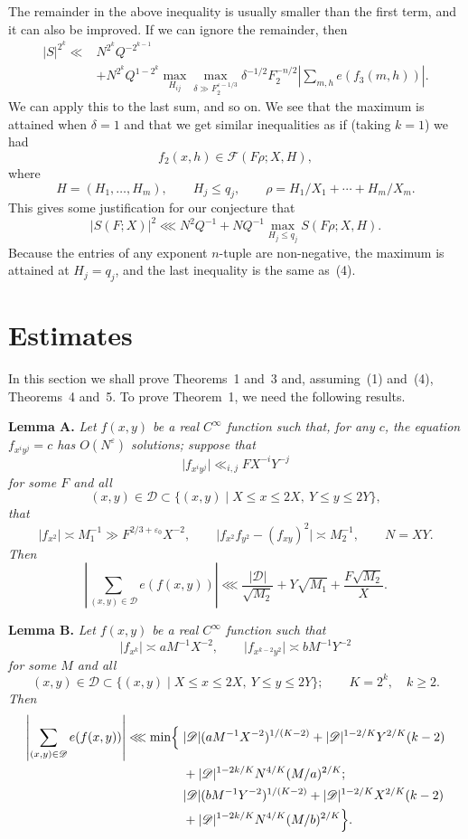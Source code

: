 \documentclass[10pt]{article}
\begin{document}
The remainder in the above inequality is usually smaller than the first term, and it can also be improved. If we can ignore the remainder, then
\[
\begin{aligned}
|S|^{2^k}\ll{}&N^{2^k}Q^{-2^{k-1}}\\
&+N^{2^k}Q^{1-2^k}
 \max_{H_{ij}}\max_{\delta\gg F_2^{\varepsilon-1/3}}
 \delta^{-1/2}F_2^{-n/2}
 \left|\sum_{m,h}e(f_3(m,h))\right|.
\end{aligned}
\]
We can apply this to the last sum, and so on. We see that the maximum is attained when $\delta=1$ and that we get similar inequalities as if (taking $k=1$) we had
\[
  f_2(x,h)\in\mathscr F(F\rho;X,H),
\]
where
\[
  H=(H_1,\ldots,H_m),\qquad H_j\leqslant q_j,
  \qquad \rho=H_1/X_1+\cdots+H_m/X_m.
\]
This gives some justification for our conjecture that
\[
  |S(F;X)|^2\lll N^2Q^{-1}+NQ^{-1}
  \max_{H_j\leqslant q_j}S(F\rho;X,H).
\]
Because the entries of any exponent $n$-tuple are non-negative, the maximum is attained at $H_j=q_j$, and the last inequality is the same as~(4).


\section{Estimates}

In this section we shall prove Theorems~1 and~3 and, assuming~(1) and~(4), Theorems~4 and~5. To prove Theorem~1, we need the following results.

\medskip
\noindent\textbf{Lemma A.}
\textit{Let $f(x,y)$ be a real $C^\infty$ function such that, for any $c$, the equation $f_{x^i y^j}=c$ has $O(N^\varepsilon)$ solutions; suppose that
\[
  \lvert f_{x^i y^j}\rvert\ll_{i,j}FX^{-i}Y^{-j}
\]
for some $F$ and all
\[
  (x,y)\in\mathscr D\subset
  \{(x,y)\mid X\leqslant x\leqslant2X,\ Y\leqslant y\leqslant2Y\},
\]
that
\[
  \lvert f_{x^2}\rvert\asymp M_1^{-1}\gg F^{2/3+\varepsilon_0}X^{-2},
  \qquad
  \bigl\lvert f_{x^2}f_{y^2}-(f_{xy})^2\bigr\rvert\asymp M_2^{-1},
  \qquad N=XY.
\]
Then
\[
  \left\lvert\sum_{(x,y)\in\mathscr D}e(f(x,y))\right\rvert
  \lll \frac{\lvert\mathscr D\rvert}{\sqrt{M_2}}
       +Y\sqrt{M_1}+\frac{F\sqrt{M_2}}{X}.
\]}

\medskip
\noindent\textbf{Lemma B.}
\textit{Let $f(x,y)$ be a real $C^\infty$ function such that
\[
  \lvert f_{x^k}\rvert\asymp aM^{-1}X^{-2},
  \qquad
  \lvert f_{x^{k-2}y^2}\rvert\asymp bM^{-1}Y^{-2}
\]
for some $M$ and all
\[
  (x,y)\in\mathscr D\subset
  \{(x,y)\mid X\leqslant x\leqslant2X,\ Y\leqslant y\leqslant2Y\};
  \qquad K=2^k,\quad k\geqslant2.
\]
Then
\[
\begin{aligned}
\left\lvert\sum_{(x,y)\in\mathscr D}e(f(x,y))\right\rvert
\lll \min\Bigl\{\;&
 \lvert\mathscr D\rvert(aM^{-1}X^{-2})^{1/(K-2)}
 +\lvert\mathscr D\rvert^{1-2/K}Y^{2/K}(k-2)\\
&+\lvert\mathscr D\rvert^{1-2k/K}N^{4/K}(M/a)^{2/K};\\
&\lvert\mathscr D\rvert(bM^{-1}Y^{-2})^{1/(K-2)}
 +\lvert\mathscr D\rvert^{1-2/K}X^{2/K}(k-2)\\
&+\lvert\mathscr D\rvert^{1-2k/K}N^{4/K}(M/b)^{2/K}
\Bigr\}.
\end{aligned}
\]}
\end{document}
